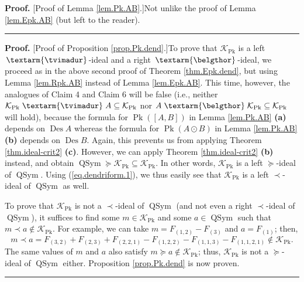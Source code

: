\documentclass[numbers=enddot,12pt,final,onecolumn,notitlepage]{scrartcl}%
\theoremstyle{definition}
\newenvironment{proof}[1][Proof]{\noindent\textbf{#1.} }{\ \rule{0.5em}{0.5em}}
\newcommand{\tvi}{\left. \textarm{\tvimadur} \right.}
\newcommand{\bel}{\left. \textarm{\belgthor} \right.}
\begin{document}
\begin{proof}
[Proof of Lemma \ref{lem.Pk.AB}.]Not unlike the proof of Lemma
\ref{lem.Epk.AB} (but left to the reader).
\end{proof}

\begin{proof}
[Proof of Proposition \ref{prop.Pk.dend}.]To prove that $\mathcal{K}%
_{\operatorname*{Pk}}$ is a left $\tvi$-ideal and a right $\bel$-ideal, we
proceed as in the above second proof of Theorem \ref{thm.Epk.dend}, but using
Lemma \ref{lem.Rpk.AB} instead of Lemma \ref{lem.Epk.AB}. This time, however,
the analogues of Claim 4 and Claim 6 will be false (i.e., neither
$\mathcal{K}_{\operatorname*{Pk}}\tvi A\subseteq\mathcal{K}%
_{\operatorname*{Pk}}$ nor $A\bel\mathcal{K}_{\operatorname*{Pk}}%
\subseteq\mathcal{K}_{\operatorname*{Pk}}$ will hold), because the formula for
$\operatorname*{Pk}\left(  \left[  A,B\right]  \right)  $ in Lemma
\ref{lem.Pk.AB} \textbf{(a)} depends on $\operatorname*{Des}A$ whereas the
formula for $\operatorname*{Pk}\left(  A\odot B\right)  $ in Lemma
\ref{lem.Pk.AB} \textbf{(b)} depends on $\operatorname*{Des}B$. Again, this
prevents us from applying Theorem \ref{thm.ideal-crit2} \textbf{(c)}. However,
we can apply Theorem \ref{thm.ideal-crit2} \textbf{(b)} instead, and obtain
$\operatorname*{QSym}\left.  \succeq\right.  \mathcal{K}_{\operatorname*{Pk}%
}\subseteq\mathcal{K}_{\operatorname*{Pk}}$. In other words, $\mathcal{K}%
_{\operatorname*{Pk}}$ is a left $\left.  \succeq\right.  $-ideal of
$\operatorname*{QSym}$. Using (\ref{eq.dendriform.1}), we thus easily see that
$\mathcal{K}_{\operatorname*{Pk}}$ is a left $\left.  \prec\right.  $-ideal of
$\operatorname*{QSym}$ as well.

To prove that $\mathcal{K}_{\operatorname*{Pk}}$ is not a $\left.
\prec\right.  $-ideal of $\operatorname*{QSym}$ (and not even a right $\left.
\prec\right.  $-ideal of $\operatorname*{QSym}$), it suffices to find some
$m\in\mathcal{K}_{\operatorname*{Pk}}$ and some $a\in\operatorname*{QSym}$
such that $m\left.  \prec\right.  a\notin\mathcal{K}_{\operatorname*{Pk}}$.
For example, we can take $m=F_{\left(  1,2\right)  }-F_{\left(  3\right)  }$
and $a=F_{\left(  1\right)  }$; then,
\[
m\left.  \prec\right.  a=F_{\left(  3,2\right)  }+F_{\left(  2,3\right)
}+F_{\left(  2,2,1\right)  }-F_{\left(  1,2,2\right)  }-F_{\left(
1,1,3\right)  }-F_{\left(  1,1,2,1\right)  }\notin\mathcal{K}%
_{\operatorname*{Pk}}.
\]
The same values of $m$ and $a$ also satisfy $m\left.  \succeq\right.
a\notin\mathcal{K}_{\operatorname*{Pk}}$; thus, $\mathcal{K}%
_{\operatorname*{Pk}}$ is not a $\left.  \succeq\right.  $-ideal of
$\operatorname*{QSym}$ either. Proposition \ref{prop.Pk.dend} is now proven.
\end{proof}
\end{document}
